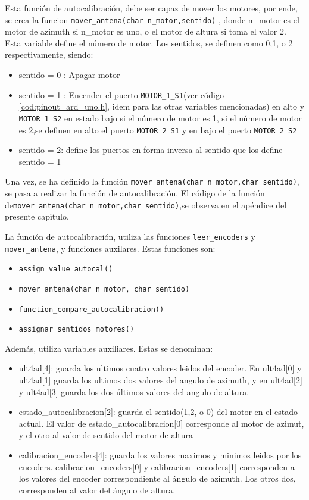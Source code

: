 Esta función de autocalibración, debe ser capaz de mover los motores, por ende, se crea la funcion \texttt{mover_antena(char n_motor,sentido)} , donde n\_motor es el motor de azimuth si n\_motor es uno, o el motor de altura si toma el valor 2. Esta variable define el número de motor. Los sentidos, se definen  como 0,1, o 2 respectivamente, siendo: 
\begin{itemize}
	\item sentido = 0 :  Apagar motor 
	\item sentido = 1 :  Encender el puerto  \texttt{MOTOR_1_S1}(ver código \ref{cod:pinout_ard_uno.h}, idem para las otras variables mencionadas) en alto y \texttt{MOTOR_1_S2} en estado bajo si el número de motor es 1, si el número de motor es 2,se definen en alto el puerto  \texttt{MOTOR_2_S1} y en bajo el puerto 
	\texttt{MOTOR_2_S2} 
	\item sentido = 2: define los puertos en forma inversa al sentido que los define sentido = 1 
\end{itemize}
 
Una vez, se ha definido la función \texttt{mover_antena(char n\_motor,char sentido)}, se pasa a realizar la función de autocalibración.  El código de la función de\texttt{mover_antena(char n\_motor,char sentido)},se observa en el apéndice del presente capìtulo.   

La función de autocalibración, utiliza las funciones \texttt{leer_encoders} y \texttt{mover_antena}, y funciones auxilares. Estas funciones son: 

\begin{itemize}
	\item \texttt{assign_value_autocal()}  
	\item \texttt{mover_antena(char n_motor, char sentido)}   
	\item \texttt{function_compare_autocalibracion()}  
	\item \texttt{assignar_sentidos_motores()}
\end{itemize}

Además, utiliza variables auxiliares. Estas se denominan: 
\begin{itemize}
	\item ult4ad[4]: guarda los ultimos cuatro valores leidos del encoder. En ult4ad[0] y ult4ad[1] guarda los ultimos dos valores del angulo de azimuth, y en ult4ad[2] y ult4ad[3] guarda los dos últimos valores del angulo de altura. 
	\item estado\_autocalibracion[2]: guarda el sentido(1,2, o 0) del motor en el estado actual. El valor de estado\_autocalibracion[0] corresponde al motor de azimut, y el otro al valor de sentido del motor de altura 
	\item calibracion\_encoders[4]: guarda los valores maximos y minimos leidos por los encoders. calibracion\_encoders[0] y calibracion\_encoders[1] corresponden a los valores del encoder correspondiente al ángulo de azimuth. Los otros dos, corresponden al valor del ángulo de altura.   
\end{itemize}

